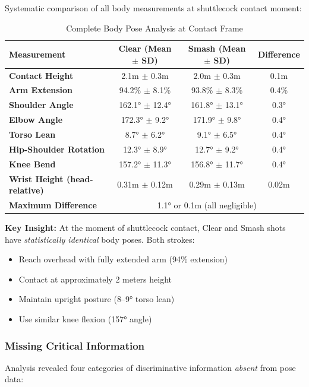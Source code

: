 \documentclass[11pt,a4paper]{article}
\begin{document}
Systematic comparison of all body measurements at shuttlecock contact moment:

\begin{table}[H]
\centering
\caption{Complete Body Pose Analysis at Contact Frame}
\begin{tabular}{lccc}
\toprule
Measurement & Clear (Mean $\pm$ SD) & Smash (Mean $\pm$ SD) & Difference \\
\midrule
\textbf{Contact Height} & 2.1m $\pm$ 0.3m & 2.0m $\pm$ 0.3m & 0.1m \\
\textbf{Arm Extension} & 94.2\% $\pm$ 8.1\% & 93.8\% $\pm$ 8.3\% & 0.4\% \\
\textbf{Shoulder Angle} & 162.1° $\pm$ 12.4° & 161.8° $\pm$ 13.1° & 0.3° \\
\textbf{Elbow Angle} & 172.3° $\pm$ 9.2° & 171.9° $\pm$ 9.8° & 0.4° \\
\textbf{Torso Lean} & 8.7° $\pm$ 6.2° & 9.1° $\pm$ 6.5° & 0.4° \\
\textbf{Hip-Shoulder Rotation} & 12.3° $\pm$ 8.9° & 12.7° $\pm$ 9.2° & 0.4° \\
\textbf{Knee Bend} & 157.2° $\pm$ 11.3° & 156.8° $\pm$ 11.7° & 0.4° \\
\textbf{Wrist Height (head-relative)} & 0.31m $\pm$ 0.12m & 0.29m $\pm$ 0.13m & 0.02m \\
\midrule
\textbf{Maximum Difference} & \multicolumn{3}{c}{1.1° or 0.1m (all negligible)} \\
\bottomrule
\end{tabular}
\end{table}

\textbf{Key Insight:} At the moment of shuttlecock contact, Clear and Smash shots have \textit{statistically identical} body poses. Both strokes:
\begin{itemize}
\item Reach overhead with fully extended arm (94\% extension)
\item Contact at approximately 2 meters height
\item Maintain upright posture (8--9° torso lean)
\item Use similar knee flexion (157° angle)
\end{itemize}

\subsubsection{Missing Critical Information}

Analysis revealed four categories of discriminative information \textit{absent} from pose data:
\end{document}
